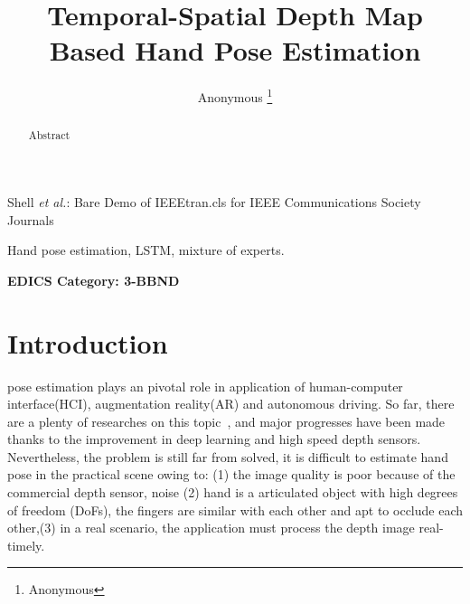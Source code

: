 \documentclass[journal,comsoc]{IEEEtran}
\begin{document}
\title{Temporal-Spatial Depth Map Based Hand Pose Estimation}

\author{{Anonymous}%
\thanks{Anonymous}}

%
{Shell \MakeLowercase{\textit{et al.}}: Bare Demo of IEEEtran.cls for IEEE Communications Society Journals}

\maketitle

\begin{abstract}
Abstract
\end{abstract}

\begin{IEEEkeywords}
Hand pose estimation, LSTM, mixture of experts.
\end{IEEEkeywords}


\ifCLASSOPTIONpeerreview
\begin{center} \bfseries EDICS Category: 3-BBND \end{center}
\fi
%
\IEEEpeerreviewmaketitle



\section{Introduction}\label{sec:introduction}
 pose estimation plays an pivotal role in application of human-computer
interface(HCI), augmentation reality(AR) and autonomous driving\cite{barsoum2016articulated}. So 
far, there are a plenty of researches on this topic~\cite{guo2017region, quach2016depth, ge2017_3D, 
wan2017crossing}, and major progresses have been made thanks to the improvement in deep learning 
and high speed depth sensors. Nevertheless, the problem is still far from solved, it is difficult 
to estimate hand pose in the practical scene owing to: (1) the image quality is poor because of 
the commercial depth sensor, noise (2) hand is a articulated object with high degrees of freedom 
(DoFs), the fingers are similar with each other and apt to occlude each other,(3) in a real scenario, 
the application must process the depth image real-timely.
\end{document}
